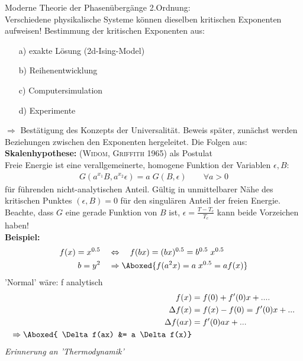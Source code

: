 \documentclass[12pt]{article}
\begin{document}
Moderne Theorie der Phasenübergänge 2.Ordnung: \\
Verschiedene physikalische Systeme können dieselben kritischen Exponenten aufweisen! %
Bestimmung der kritischen Exponenten aus:
\begin{enumerate}
\item[a)] exakte Lösung (2d-Ising-Model)
\item[b)]Reihenentwicklung
\item[c)]Computersimulation
\item[d)]Experimente
\end{enumerate}
$\Rightarrow$ Bestätigung des Konzepts der Universalität. Beweis später, zunächst werden Beziehungen zwischen den Exponenten hergeleitet. Die Folgen aus: \\
\textbf{Skalenhypothese:}  (\textsc{Widom, Griffith} 1965) als Postulat \\
Freie Energie ist eine verallgemeinerte, homogene Funktion der Variablen $\epsilon, B$:
 \begin{align}
G(a^{x_1} B, a^{x_2} \epsilon)= a \; G(B, \epsilon) \quad \quad \forall a > 0 \label{SkalenHypothese}
\end{align} 
für führenden nicht-analytischen Anteil. Gültig in unmittelbarer Nähe des kritischen Punktes $(\epsilon, B) =0$ für den singulären Anteil der freien Energie. Beachte, dass $G$ eine gerade Funktion von $B$ ist, $\epsilon = \frac{T-T_c}{T_c}$ kann beide Vorzeichen haben!\\
\textbf{Beispiel:}
\begin{align*}
f(x) = x^{0.5} \quad & \Leftrightarrow \quad f(bx) = (bx)^{0.5} = b^{0.5} \; x^{0.5} \\
b= y^2 \quad &\Rightarrow \Aboxed{ f(a^2 x) = a \; x^{0.5} = a f(x) }
\end{align*}
'Normal' wäre: f analytisch
\begin{align*}
f(x) &= f(0) + f'(0)x + .... \\
 \Delta f(x) &= f(x) - f(0) = f'(0)x+... \\
\Delta f(ax) &= f'(0) ax +... \\
\Rightarrow \Aboxed{ \Delta f(ax) &= a \Delta f(x)}
\end{align*} 
\textit{Erinnerung an 'Thermodynamik'} \\
\end{document}

